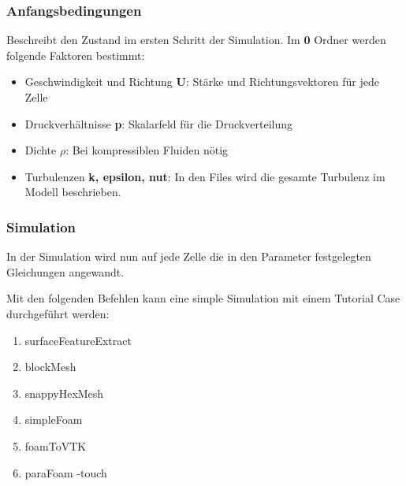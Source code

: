 \subsubsection{Anfangsbedingungen \label{openfoam:section:Anfangsbedingungen}}
Beschreibt den Zustand im ersten Schritt der Simulation. Im \textbf{0} Ordner werden folgende Faktoren bestimmt:
\begin{itemize}
    \item Geschwindigkeit und Richtung \textbf{U}: Stärke und Richtungsvektoren für jede Zelle
    \item Druckverhältnisse \textbf{p}: Skalarfeld für die Druckverteilung
    \item Dichte $\rho$: Bei kompressiblen Fluiden nötig %
    \item Turbulenzen \textbf{k, epsilon, nut}: In den Files wird die gesamte Turbulenz im Modell beschrieben.  
\end{itemize}

\subsubsection{Simulation\label{openfoam:section:Simulation}}
In der Simulation wird nun auf jede Zelle die in den Parameter festgelegten Gleichungen angewandt. 

Mit den folgenden Befehlen kann eine simple Simulation mit einem Tutorial Case durchgeführt werden:

\begin{enumerate}
    \item surfaceFeatureExtract
    \item blockMesh
    \item snappyHexMesh
    \item simpleFoam
    \item foamToVTK
    \item paraFoam -touch

\end{enumerate} 


